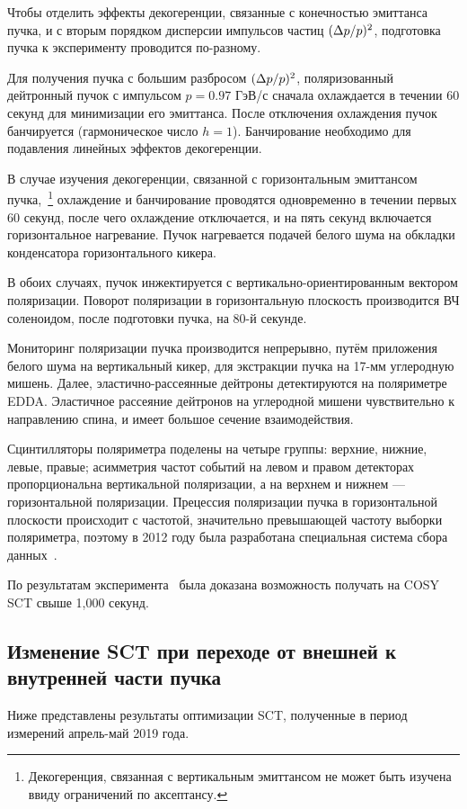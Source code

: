 Чтобы отделить эффекты декогеренции, связанные с конечностью эмиттанса пучка, и с вторым порядком дисперсии импульсов частиц $(\Delta p/p)^2$, подготовка пучка к эксперименту проводится по-разному.

Для получения пучка с большим разбросом $(\Delta p/p)^2$, поляризованный дейтронный пучок с импульсом $p=0.97$ ГэВ/с сначала охлаждается в течении 60 секунд для минимизации его эмиттанса. После отключения охлаждения пучок банчируется (гармоническое число $h=1$). Банчирование необходимо для подавления линейных эффектов декогеренции.

В случае изучения декогеренции, связанной с горизонтальным эмиттансом пучка,~\footnote{Декогеренция, связанная с вертикальным эмиттансом не может быть изучена ввиду ограничений по аксептансу.} охлаждение и банчирование проводятся одновременно в течении первых 60 секунд, после чего охлаждение отключается, и на пять секунд включается горизонтальное нагревание. Пучок нагревается подачей белого шума на обкладки конденсатора горизонтального кикера.

В обоих случаях, пучок инжектируется с вертикально-ориентированным вектором поляризации. Поворот поляризации в горизонтальную плоскость производится ВЧ соленоидом, после подготовки пучка, на 80-й секунде.

Мониторинг поляризации пучка производится непрерывно, путём приложения белого шума на вертикальный кикер, для экстракции пучка на 17-мм углеродную мишень. Далее, эластично-рассеянные дейтроны детектируются на поляриметре EDDA. Эластичное рассеяние дейтронов на углеродной мишени чувствительно к направлению спина, и имеет большое сечение взаимодействия. 

Сцинтилляторы поляриметра поделены на четыре группы: верхние, нижние, левые, правые; асимметрия частот событий на левом и правом детекторах пропорциональна вертикальной поляризации, а на верхнем и нижнем --- горизонтальной поляризации. Прецессия поляризации пучка в горизонтальной плоскости происходит с частотой, значительно превышающей частоту выборки поляриметра, поэтому в 2012 году была разработана специальная система сбора данных~\cite{COSY:DAQ}.

По результатам эксперимента~\cite{Guidoboni:STORI14} была доказана возможность получать на COSY SCT свыше 1,000 секунд. 

\subsection{Изменение SCT при переходе от внешней к внутренней части пучка}
Ниже представлены результаты оптимизации SCT, полученные в период измерений апрель-май 2019 года. 

